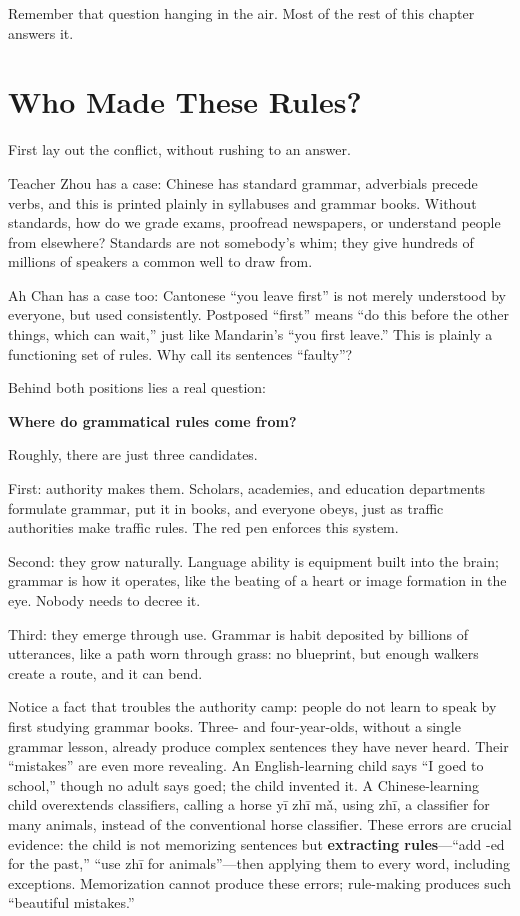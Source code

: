 Remember that question hanging in the air. Most of the rest of this chapter answers it.

\section{Who Made These Rules?}
First lay out the conflict, without rushing to an answer.

Teacher Zhou has a case: Chinese has standard grammar, adverbials precede verbs, and this is printed plainly in syllabuses and grammar books. Without standards, how do we grade exams, proofread newspapers, or understand people from elsewhere? Standards are not somebody's whim; they give hundreds of millions of speakers a common well to draw from.

Ah Chan has a case too: Cantonese ``you leave first'' is not merely understood by everyone, but used consistently. Postposed ``first'' means ``do this before the other things, which can wait,'' just like Mandarin's ``you first leave.'' This is plainly a functioning set of rules. Why call its sentences ``faulty''?

Behind both positions lies a real question:

\textbf{Where do grammatical rules come from?}

Roughly, there are just three candidates.

First: authority makes them. Scholars, academies, and education departments formulate grammar, put it in books, and everyone obeys, just as traffic authorities make traffic rules. The red pen enforces this system.

Second: they grow naturally. Language ability is equipment built into the brain; grammar is how it operates, like the beating of a heart or image formation in the eye. Nobody needs to decree it.

Third: they emerge through use. Grammar is habit deposited by billions of utterances, like a path worn through grass: no blueprint, but enough walkers create a route, and it can bend.

Notice a fact that troubles the authority camp: people do not learn to speak by first studying grammar books. Three- and four-year-olds, without a single grammar lesson, already produce complex sentences they have never heard. Their ``mistakes'' are even more revealing. An English-learning child says ``I goed to school,'' though no adult says goed; the child invented it. A Chinese-learning child overextends classifiers, calling a horse yī zhī mǎ, using zhī, a classifier for many animals, instead of the conventional horse classifier. These errors are crucial evidence: the child is not memorizing sentences but \textbf{extracting rules}---``add -ed for the past,'' ``use zhī for animals''---then applying them to every word, including exceptions. Memorization cannot produce these errors; rule-making produces such ``beautiful mistakes.''

